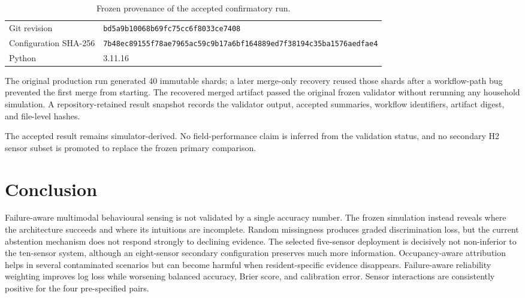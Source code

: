 \documentclass[11pt]{article}
\begin{document}
\begin{table}[h]
\centering
\small
\caption{Frozen provenance of the accepted confirmatory run.}
\label{tab:provenance}
\begin{tabular}{@{}l p{7.2cm}@{}}
\toprule
Git revision & \texttt{bd5a9b10\allowbreak 068b69fc\allowbreak 75cc6f80\allowbreak 69044306\allowbreak 33ce7408} \\
Configuration SHA-256 & \texttt{7b48ec89\allowbreak 155f78ae\allowbreak 7965ac59\allowbreak c9b17a6b\allowbreak f164889e\allowbreak d7f38194\allowbreak c35ba157\allowbreak 6aedfae4} \\
Python & 3.11.16 \\
\bottomrule
\end{tabular}
\end{table}

The original production run generated 40 immutable shards; a later merge-only recovery reused those shards after a workflow-path bug prevented the first merge from starting. The recovered merged artifact passed the original frozen validator without rerunning any household simulation. A repository-retained result snapshot records the validator output, accepted summaries, workflow identifiers, artifact digest, and file-level hashes.

The accepted result remains simulator-derived. No field-performance claim is inferred from the validation status, and no secondary H2 sensor subset is promoted to replace the frozen primary comparison.

\section{Conclusion}

Failure-aware multimodal behavioural sensing is not validated by a single accuracy number. The frozen simulation instead reveals where the architecture succeeds and where its intuitions are incomplete. Random missingness produces graded discrimination loss, but the current abstention mechanism does not respond strongly to declining evidence. The selected five-sensor deployment is decisively not non-inferior to the ten-sensor system, although an eight-sensor secondary configuration preserves much more information. Occupancy-aware attribution helps in several contaminated scenarios but can become harmful when resident-specific evidence disappears. Failure-aware reliability weighting improves log loss while worsening balanced accuracy, Brier score, and calibration error. Sensor interactions are consistently positive for the four pre-specified pairs.
\end{document}

